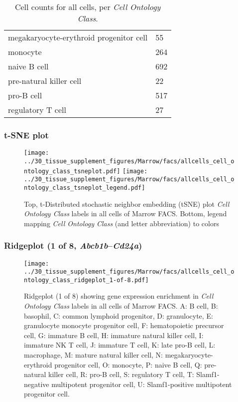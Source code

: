 \begin{table}[h]
\begin{tabular}{@{}ll@{}}
megakaryocyte-erythroid progenitor cell & 55 \\

monocyte & 264 \\

naive B cell & 692 \\

pre-natural killer cell & 22 \\

pro-B cell & 517 \\

regulatory T cell & 27 \\
\bottomrule
\end{tabular}
\caption{Cell counts for all cells, per \emph{Cell Ontology Class}.}
\end{table}

\clearpage
\subsubsection{t-SNE plot}
\begin{figure}[h]
\centering
\texttt{[image: ../30\_tissue\_supplement\_figures/Marrow/facs/allcells\_cell\_ontology\_class\_tsneplot.pdf]}
\texttt{[image: ../30\_tissue\_supplement\_figures/Marrow/facs/allcells\_cell\_ontology\_class\_tsneplot\_legend.pdf]}
\caption{Top, t-Distributed stochastic neighbor embedding (tSNE) plot  \emph{Cell Ontology Class} labels in all cells of Marrow FACS. Bottom, legend mapping \emph{Cell Ontology Class} (and letter abbreviation) to colors}
\end{figure}


\clearpage

\subsubsection{Ridgeplot (1 of 8, \emph{Abcb1b}--\emph{Cd24a})}
\begin{figure}[h]
\centering
\texttt{[image: ../30\_tissue\_supplement\_figures/Marrow/facs/allcells\_cell\_ontology\_class\_ridgeplot\_1-of-8.pdf]}

\caption{ Ridgeplot (1 of 8)  showing gene expression enrichment in \emph{Cell Ontology Class} labels in all cells of Marrow FACS. A: B cell, B: basophil, C: common lymphoid progenitor, D: granulocyte, E: granulocyte monocyte progenitor cell, F: hematopoietic precursor cell, G: immature B cell, H: immature natural killer cell, I: immature NK T cell, J: immature T cell, K: late pro-B cell, L: macrophage, M: mature natural killer cell, N: megakaryocyte-erythroid progenitor cell, O: monocyte, P: naive B cell, Q: pre-natural killer cell, R: pro-B cell, S: regulatory T cell, T: Slamf1-negative multipotent progenitor cell, U: Slamf1-positive multipotent progenitor cell.}
\end{figure}


